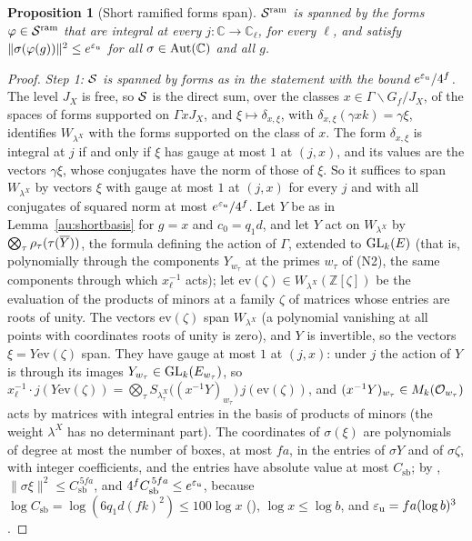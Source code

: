 \documentclass[10pt]{amsart}
\newtheorem{proposition}[theorem]{Proposition}
\theoremstyle{definition}
\theoremstyle{remark}
\newcommand{\C}{\mathbb C}
\newcommand{\Z}{\mathbb Z}
\begin{document}
\begin{proposition}[Short ramified forms span]\label{au:short}
$\mathcal S^{\mathrm{ram}}$ is spanned by the forms $\varphi\in\mathcal S^{\mathrm{ram}}$ that are integral at every
$j\colon\C\to\C_\ell$, for every $\ell$, and satisfy $\|\sigma(\varphi(g))\|^2\le e^{\varepsilon_{\mathrm u}}$ for
all $\sigma\in\auAut(\C)$ and all $g$.
\end{proposition}
\begin{proof}
\emph{Step 1: $\mathcal S$ is spanned by forms as in the statement with the bound $e^{\varepsilon_{\mathrm u}}/4^f$.}
The level $J_X$ is free, so $\mathcal S$ is the direct sum, over the classes $x\in\Gamma\backslash G_f/
J_X$, of the spaces of forms supported on $\Gamma xJ_X$, and $\xi\mapsto\delta_{x,\xi}$, with
$\delta_{x,\xi}(\gamma xk)=\gamma\xi$, identifies $W_{\lambda^X}$ with the forms supported on the
class of $x$. The form $\delta_{x,\xi}$ is integral at $j$ if and only if $\xi$ has gauge at most
$1$ at $(j,x)$, and its values are the vectors $\gamma\xi$, whose conjugates have the norm of
those of $\xi$. So it suffices to span $W_{\lambda^X}$ by vectors $\xi$ with gauge at most $1$ at
$(j,x)$ for every $j$ and with all conjugates of squared norm at most $e^{\varepsilon_{\mathrm u}}/4^f$. Let $Y$ be
as in Lemma~\ref{au:shortbasis} for $g=x$ and $c_0=q_1d$, and let $Y$ act on $W_{\lambda^X}$
by $\bigotimes_\tau\rho_\tau(\tau(\overline{Y}))$, the formula defining the action of $\Gamma$, extended
to $\mathrm{GL}_k(E)$ (that is, polynomially through the components $Y_{w_\tau}$ at the primes $w_\tau$
of (N2), the same components through which $x_\ell^{-1}$ acts); let $\mathrm{ev}(\zeta)\in W_{\lambda^X}(\Z[\zeta])$ be the evaluation of
the products of minors at a family $\zeta$ of matrices whose entries are roots of unity. The
vectors $\mathrm{ev}(\zeta)$ span $W_{\lambda^X}$ (a polynomial vanishing at all points with
coordinates roots of unity is zero), and $Y$ is invertible, so the vectors $\xi=Y\mathrm{ev}
(\zeta)$ span. They have gauge at most $1$ at $(j,x)$: under $j$ the action of $Y$ is through its images
$Y_{w_\tau}\in\mathrm{GL}_k(E_{w_\tau})$, so $x_\ell^{-1}\cdot j(Y\mathrm{ev}(\zeta))=\bigotimes_\tau
S_{\lambda^X_\tau}\bigl((x^{-1}Y)_{w_\tau}\bigr)\,j(\mathrm{ev}(\zeta))$, and $(x^{-1}Y)_{w_\tau}\in
M_k(\mathcal O_{w_\tau})$ acts by matrices with integral entries in the basis of products of minors (the weight $\lambda^X$ has no
determinant part). The coordinates of
$\sigma(\xi)$ are polynomials of degree at most the number of boxes, at most $fa$, in the entries
of $\sigma Y$ and of $\sigma\zeta$, with integer coefficients, and the entries have absolute value
at most $C_{\mathrm{sb}}$; by {\cite[Lemma~8.9]{P49}}, $\|\sigma\xi\|^2\le C_{\mathrm{sb}}^{\,5fa}$, and
$4^fC_{\mathrm{sb}}^{\,5fa}\le e^{\varepsilon_{\mathrm u}}$, because
$\log C_{\mathrm{sb}}=\log(6q_1d(fk)^2)\le100\log x$ ({\cite[Lemma~8.8]{P49}}), $\log x\le\log b$, and
$\varepsilon_{\mathrm u}=fa(\log b)^3$.


\end{proof}
\end{document}
